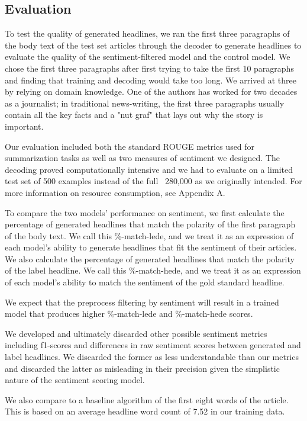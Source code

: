 \documentclass[11pt]{article}
\begin{document}
\subsection{Evaluation} To test the quality of generated headlines, we ran the first three paragraphs of the body text of the test set articles through the decoder to generate headlines to evaluate the quality of the sentiment-filtered model and the control model. We chose the first three paragraphs after first trying to take the first 10 paragraphs and finding that training and decoding would take too long. We arrived at three by relying on domain knowledge. One of the authors has worked for two decades as a journalist; in traditional news-writing, the first three paragraphs usually contain all the key facts and a "nut graf" that lays out why the story is important. 

Our evaluation included both the standard ROUGE metrics used for summarization tasks as well as two measures of sentiment we designed. The decoding proved computationally intensive and we had to evaluate on a limited test set of 500 examples instead of the full ~280,000 as we originally intended. For more information on resource consumption, see Appendix A.

To compare the two models' performance on sentiment, we first calculate the percentage of generated headlines that match the polarity of the first paragraph of the body text. We call this \%-match-lede, and we treat it as an expression of each model's ability to generate headlines that fit the sentiment of their articles. We also calculate the percentage of generated headlines that match the polarity of the label headline. We call this \%-match-hede, and we treat it as an expression of each model's ability to match the sentiment of the gold standard headline. 

We expect that the preprocess filtering by sentiment will result in a trained model that produces higher \%-match-lede and \%-match-hede scores. 

We developed and ultimately discarded other possible sentiment metrics including f1-scores and differences in raw sentiment scores between generated and label headlines. We discarded the former as less understandable than our metrics and discarded the latter as misleading in their precision given the simplistic nature of the sentiment scoring model.

We also compare to a baseline algorithm of the first eight words of the article. This is based on an average headline word count of 7.52 in our training data.
\end{document}
